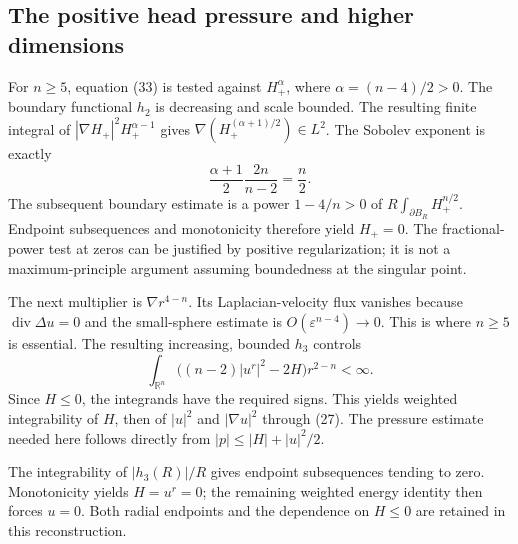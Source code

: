 \documentclass[10pt]{article}
\begin{document}
\subsection*{The positive head pressure and higher dimensions}
For \(n\geq5\), equation (33) is tested against \(H_+^\alpha\), where \(\alpha=(n-4)/2>0\). The boundary functional \(h_2\) is decreasing and scale bounded. The resulting finite integral of \(|\nabla H_+|^2H_+^{\alpha-1}\) gives \(\nabla(H_+^{(\alpha+1)/2})\in L^2\). The Sobolev exponent is exactly \[\frac{\alpha+1}{2}\frac{2n}{n-2}=\frac n2.\] The subsequent boundary estimate is a power \(1-4/n>0\) of \(R\int_{\partial B_R}H_+^{n/2}\). Endpoint subsequences and monotonicity therefore yield \(H_+=0\). The fractional-power test at zeros can be justified by positive regularization; it is not a maximum-principle argument assuming boundedness at the singular point.\par
The next multiplier is \(\nabla r^{4-n}\). Its Laplacian-velocity flux vanishes because \(\operatorname{div}\Delta u=0\) and the small-sphere estimate is \(O(\varepsilon^{n-4})\to0\). This is where \(n\geq5\) is essential. The resulting increasing, bounded \(h_3\) controls \[\int_{\mathbb R^n}\bigl((n-2)|u^r|^2-2H\bigr)r^{2-n}<\infty.\] Since \(H\leq0\), the integrands have the required signs. This yields weighted integrability of \(H\), then of \(|u|^2\) and \(|\nabla u|^2\) through (27). The pressure estimate needed here follows directly from \(|p|\leq|H|+|u|^2/2\).\par
The integrability of \(|h_3(R)|/R\) gives endpoint subsequences tending to zero. Monotonicity yields \(H=u^r=0\); the remaining weighted energy identity then forces \(u=0\). Both radial endpoints and the dependence on \(H\leq0\) are retained in this reconstruction.\par
\end{document}
